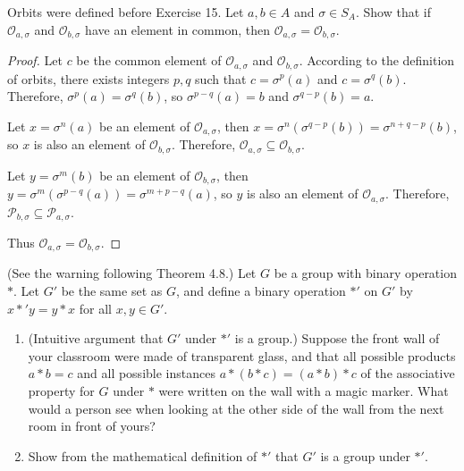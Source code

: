 \begin{exercise}
    Orbits were defined before Exercise 15. Let $a, b\in A$ and $\sigma\in S_{A}$. Show that if $\mathcal{O}_{a,\sigma}$ and $\mathcal{O}_{b,\sigma}$ have an element in common, then $\mathcal{O}_{a,\sigma} = \mathcal{O}_{b,\sigma}$.
\end{exercise}

\begin{proof}
    Let $c$ be the common element of $\mathcal{O}_{a,\sigma}$ and $\mathcal{O}_{b,\sigma}$. According to the definition of orbits, there exists integers $p, q$ such that $c = \sigma^{p}(a)$ and $c = \sigma^{q}(b)$. Therefore, $\sigma^{p}(a) = \sigma^{q}(b)$, so $\sigma^{p-q}(a) = b$ and $\sigma^{q-p}(b) = a$.

    Let $x = \sigma^{n}(a)$ be an element of $\mathcal{O}_{a,\sigma}$, then $x = \sigma^{n}(\sigma^{q-p}(b)) = \sigma^{n+q-p}(b)$, so $x$ is also an element of $\mathcal{O}_{b,\sigma}$. Therefore, $\mathcal{O}_{a,\sigma} \subseteq \mathcal{O}_{b,\sigma}$.

    Let $y = \sigma^{m}(b)$ be an element of $\mathcal{O}_{b,\sigma}$, then $y = \sigma^{m}(\sigma^{p-q}(a)) = \sigma^{m+p-q}(a)$, so $y$ is also an element of $\mathcal{O}_{a,\sigma}$. Therefore, $\mathcal{P}_{b,\sigma} \subseteq \mathcal{P}_{a,\sigma}$.

    Thus $\mathcal{O}_{a,\sigma} = \mathcal{O}_{b,\sigma}$.
\end{proof}

\begin{exercise}
    (See the warning following Theorem 4.8.) Let $G$ be a group with binary operation $*$. Let $G'$ be the same set as $G$, and define a binary operation $*'$ on $G'$ by $x *' y = y * x$ for all $x, y\in G'$.
    \begin{enumerate}[label={\textbf{\alph*.}}]
        \item (Intuitive argument that $G'$ under $*'$ is a group.) Suppose the front wall of your classroom were made of transparent glass, and that all possible products $a * b = c$ and all possible instances $a * (b * c) = (a * b) * c$ of the associative property for $G$ under $*$ were written on the wall with a magic marker. What would a person see when looking at the other side of the wall from the next room in front of yours?
        \item Show from the mathematical definition of $*'$ that $G'$ is a group under $*'$.
    \end{enumerate}
\end{exercise}

